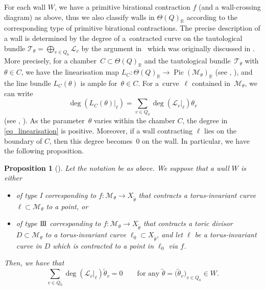 \documentclass[10pt,a4paper]{amsart}
\numberwithin{equation}{section}
\newtheorem{Proposition}[Theorem]{Proposition}
\theoremstyle{definition}
\newcommand{\RR}{\mathbb{R}}
\newcommand{\calL}{\mathcal{L}}
\newcommand{\calM}{\mathcal{M}}
\newcommand{\calT}{\mathcal{T}}
\newcommand{\Pic}{\operatorname{Pic}}
\newcommand{\typeIII}{{\rm I\hspace{-0.7pt}I\hspace{-0.7pt}I}}
\begin{document}
For each wall $W$, we have a primitive birational contraction $f$ (and a wall-crossing diagram) as above, thus we also classify walls in $\Theta(Q)_\RR$
according to the corresponding type of primitive birational contractions.
The precise description of a wall is determined by the degree of a~contracted curve on the tautological bundle $\calT_\theta=\bigoplus_{v\in Q_0}\calL_v$
by the argument in~\cite{IU_anycrepant} which was originally discussed in \cite{CrawIshii}.
More precisely, for a chamber~$C\subset\Theta(Q)_\RR$ and the tautological bundle~$\calT_\theta$ with $\theta\in C$, we have the linearisation map $L_C\colon \Theta(Q)_\RR\to \Pic(\calM_\theta)_\RR$ (see \cite[Section~3.2]{CrawIshii}, \cite[(4.1)]{IU_anycrepant}), and the line bundle $L_C(\theta)$ is ample for~$\theta\in C$. For a~curve~$\ell$ contained in~$\calM_\theta$, we can write
\begin{equation}\label{eq_linearisation}
\deg(L_C(\theta) |_\ell)=\sum_{v\in Q_0}\deg(\calL_v |_\ell)\theta_v
\end{equation}
(see \cite[equation~(5.3)]{CrawIshii}, \cite[equation~(9.6)]{IU_anycrepant}). As the parameter~$\theta$ varies within the chamber $C$, the degree in \eqref{eq_linearisation} is positive.
Moreover, if a wall contracting $\ell$ lies on the boundary of $C$, then this degree becomes~$0$ on the wall. In particular, we have the following proposition.

\begin{Proposition}[{\cite[Lemmas~11.21 and 11.30]{IU_anycrepant}}]\label{prop_equation_wall}
Let the notation be as above. We suppose that a wall $W$ is either
\begin{itemize}\itemsep=0pt
\item of type {\rm I} corresponding to $f\colon \calM_\theta\rightarrow X_{\tilde{\theta}}$ that contracts a torus-invariant curve $\ell\subset\calM_\theta$ to a point, or
\item of type $\typeIII$ corresponding to $f\colon \calM_\theta\rightarrow X_{\tilde{\theta}}$ that contracts a toric divisor $D\subset\calM_\theta$ to
a torus-invariant curve $\ell_0\subset X_{\tilde{\theta}}$,
and let $\ell$ be a torus-invariant curve in $D$ which is contracted to a point in $\ell_0$ via $f$.
\end{itemize}
Then, we have that
\begin{equation}
\sum_{v\in Q_0}\deg(\calL_v |_\ell)\tilde{\theta}_v=0 \qquad \text{for any $\tilde{\theta}=\bigl(\tilde{\theta}_v\bigr)_{v\in Q_0}\in W$.}
\label{eq_wall_equation}
\end{equation}
\end{Proposition}
\end{document}
